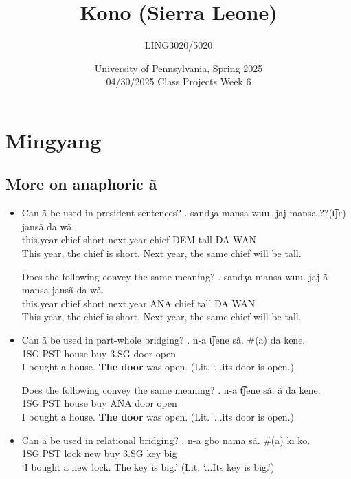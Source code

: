 \documentclass{assets/fieldnotes}
\title{Kono (Sierra Leone)}
\author{LING3020/5020}
\date{University of Pennsylvania, Spring 2025\\04/30/2025 Class Projects Week 6}
\begin{document}
\maketitle

\maketitle
\tableofcontents



 \section{Mingyang}
\subsection{More on anaphoric ã}
\begin{itemize}
    \item Can ã be used in president sentences?
    \exg. sandʒa mansa wuu. jaj mansa ??(t͡ʃɛ) jansã da wã.\\
   this.year chief short next.year chief DEM tall DA WAN\\
   This year, the chief is short. Next year, the same chief will be tall.

    Does the following convey the same meaning?
    \exg. sandʒa mansa wuu. jaj ã mansa jansã da wã.\\
   this.year chief short next.year ANA chief tall DA WAN\\
   This year, the chief is short. Next year, the same chief will be tall.

   \item Can ã be used in part-whole bridging?
    \exg. n-a t͡ʃene sã. \#(a) da kene.\\
        1SG.PST house buy 3.SG door open\\
        I bought a house. \textbf{The door} was open. (Lit. `...its door is open.)

    Does the following convey the same meaning?
    \exg. n-a t͡ʃene sã. ã da kene.\\
        1SG.PST house buy ANA door open\\
         I bought a house. \textbf{The door} was open. (Lit. `...its door is open.)

    \item Can ã be used in relational bridging?
    \exg. n-a gbo nama sã. \#(a) ki ko.\\
        1SG.PST lock new buy 3.SG key big\\
        `I bought a new lock. The key is big.' (Lit. `...Its key is big.')


\end{itemize}
\end{document}
